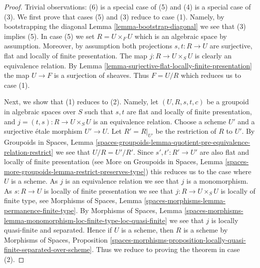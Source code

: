 \documentclass[10pt,a4paper]{amsart}
\theoremstyle{plain}
\theoremstyle{definition}
\theoremstyle{remark}
\numberwithin{equation}{subsection}
\begin{document}
\begin{proof}
Trivial observations: (6) is a special case of (5) and
(4) is a special case of (3).
We first prove that cases (5) and (3) reduce to case (1).
Namely, by bootstrapping the diagonal
Lemma \ref{lemma-bootstrap-diagonal}
we see that (3) implies (5). In case (5) we set $R = U \times_F U$ which
is an algebraic space by assumption. Moreover, by assumption both
projections $s, t : R \to U$ are surjective, flat and locally of
finite presentation. The map $j : R \to U \times_S U$ is clearly an
equivalence relation. By
Lemma \ref{lemma-surjective-flat-locally-finite-presentation}
the map $U \to F$ is a surjection of sheaves. Thus $F = U/R$
which reduces us to case (1).

\medskip\noindent
Next, we show that (1) reduces to (2).
Namely, let $(U, R, s, t, c)$ be a groupoid in algebraic spaces
over $S$ such that $s, t$ are flat and locally of finite presentation, and
$j = (t, s) : R \to U \times_S U$ is an equivalence relation.
Choose a scheme $U'$ and a surjective \'etale morphism $U' \to U$.
Let $R' = R|_{U'}$ be the restriction of $R$ to $U'$. By
Groupoids in Spaces,
Lemma \ref{spaces-groupoids-lemma-quotient-pre-equivalence-relation-restrict}
we see that $U/R = U'/R'$. Since $s', t' : R' \to U'$ are also
flat and locally of finite presentation (see
More on Groupoids in Spaces,
Lemma \ref{spaces-more-groupoids-lemma-restrict-preserves-type})
this reduces us to the case where $U$ is a scheme.
As $j$ is an equivalence relation we see that $j$ is a monomorphism.
As $s : R \to U$ is locally of finite presentation we see that
$j : R \to U \times_S U$ is locally of finite type, see
Morphisms of Spaces, Lemma \ref{spaces-morphisms-lemma-permanence-finite-type}.
By
Morphisms of Spaces, Lemma
\ref{spaces-morphisms-lemma-monomorphism-loc-finite-type-loc-quasi-finite}
we see that $j$ is locally quasi-finite and separated.
Hence if $U$ is a scheme, then $R$ is a scheme by
Morphisms of Spaces, Proposition
\ref{spaces-morphisms-proposition-locally-quasi-finite-separated-over-scheme}.
Thus we reduce to proving the theorem in case (2).


\end{proof}
\end{document}
